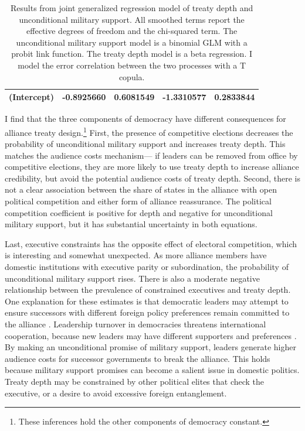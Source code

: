 \documentclass[12pt]{article}
\begin{document}
\begin{table}[ht]
\begin{tabular}{lrrrr}
  (Intercept) & -0.8925660 & 0.6081549 & -1.3310577 & 0.2833844 \\
   \hline
\end{tabular}
\caption{Results from joint generalized regression model of treaty depth and unconditional military support. 
                     All smoothed terms report the effective degrees of freedom and the chi-squared term. 
                     The unconditional military support model is a binomial GLM with a probit link function. 
                     The treaty depth model is a beta regression. 
                     I model the error correlation between the two processes with a T copula.} 
\label{tab:gjrm-res-split}
\end{table}


I find that the three components of democracy have different consequences for alliance treaty design.\footnote{These inferences hold the other components of democracy constant.}
First, the presence of competitive elections decreases the probability of unconditional military support and increases treaty depth.
This matches the audience costs mechanism--- if leaders can be removed from office by competitive elections, they are more likely to use treaty depth to increase alliance credibility, but avoid the potential audience costs of treaty depth. 
Second, there is not a clear association between the share of states in the alliance with open political competition and either form of alliance reassurance.
The political competition coefficient is positive for depth and negative for unconditional military support, but it has substantial uncertainty in both equations.


Last, executive constraints has the opposite effect of electoral competition, which is interesting and somewhat unexpected. 
As more alliance members have domestic institutions with executive parity or subordination, the probability of unconditional military support rises. 
There is also a moderate negative relationship between the prevalence of constrained executives and treaty depth.  
One explanation for these estimates is that democratic leaders may attempt to ensure successors with different foreign policy preferences remain committed to the alliance \cite{Mattes2012a}. 
Leadership turnover in democracies threatens international cooperation, because new leaders may have different supporters and preferences \citep{Lobell2004, Narizny2007, Leedsetal2009}. 
By making an unconditional promise of military support, leaders generate higher audience costs for successor governments to break the alliance. 
This holds because military support promises can become a salient issue in domestic politics. 
Treaty depth may be constrained by other political elites that check the executive, or a desire to avoid excessive foreign entanglement.  
\end{document}
